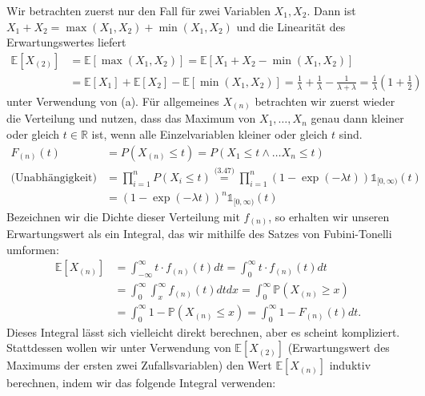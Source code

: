 \documentclass[a4paper]{article}
\begin{document}
\begin{enumerate}
	      Wir betrachten zuerst nur den Fall für zwei Variablen $X_1, X_2$. Dann ist $X_1 + X_2 = \max(X_1, X_2) + \min(X_1, X_2)$ und die Linearität des Erwartungswertes liefert
	      \begin{align*}
		      \mathds{E}[X_{(2)}] & = \mathds{E}[\max(X_1, X_2)] = \mathds{E}[X_1 + X_2 - \min(X_1, X_2)] \\ &= \mathds{E}[X_1] + \mathds{E}[X_2] - \mathds{E}[\min(X_1, X_2)]
		      = \frac{1}{\lambda} + \frac{1}{\lambda} - \frac{1}{\lambda + \lambda} = \frac{1}{\lambda}(1 + \frac{1}{2})
	      \end{align*}
	      unter Verwendung von (a).
	      Für allgemeines $X_{(n)}$ betrachten wir zuerst wieder die Verteilung und nutzen, dass das Maximum von $X_1, \dots, X_n$ genau dann kleiner oder gleich $t \in \mathds{R}$ ist, wenn alle Einzelvariablen kleiner oder gleich $t$ sind.
	      \begin{align*}
		      F_{(n)}(t)              & = P(X_{(n)} \leq t ) = P(X_1 \leq t \wedge \dots X_n \leq t)           \\
		      \text{(Unabhängigkeit)} & = \prod_{i = 1}^{n} P(X_i \leq t)                                       \overset{\text{(3.47)}  }{=} \prod_{i = 1}^{n} (1 - \exp(-\lambda t)) \mathds{1}_{[0, \infty)}(t) \\
		                              & = (1 - \exp(-\lambda t))^n \mathds{1}_{[0, \infty)}(t)
	      \end{align*}
	      Bezeichnen wir die Dichte dieser Verteilung mit $f_{(n)}$, so erhalten wir unseren Erwartungswert als ein Integral, das wir mithilfe des Satzes von Fubini-Tonelli umformen:
	      \begin{align*}
		      \mathds{E}[X_{(n)}] & = \int_{-\infty}^{\infty} t \cdot f_{(n)} (t) dt = \int_{0}^{\infty} t \cdot f_{(n)}(t) dt             \\
		                          & = \int_{0}^{\infty} \int_{x}^{\infty} f_{(n)} (t) dt dx = \int_{0}^{\infty} \mathds{P}(X_{(n)} \geq x) \\
		                          & = \int_{0}^{\infty} 1 - \mathds{P}(X_{(n)} \leq x) = \int_{0}^{\infty} 1 - F_{(n)}(t) dt\text{.}
	      \end{align*}
	      Dieses Integral lässt sich vielleicht direkt berechnen, aber es scheint kompliziert. Stattdessen wollen wir unter Verwendung von $\mathds{E}[X_{(2)}]$ (Erwartungswert des Maximums der ersten zwei Zufallsvariablen) den Wert $\mathds{E}[X_{(n)}]$ induktiv berechnen, indem wir das folgende Integral verwenden:
	      \begin{align*}

\end{align*}
\end{enumerate}
\end{document}
